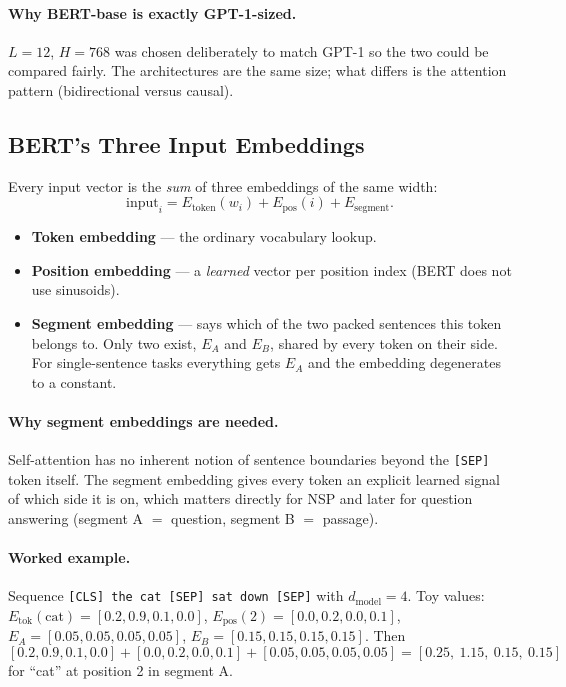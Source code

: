 \documentclass[11pt,a4paper]{article}
\begin{document}
\paragraph{Why BERT-base is exactly GPT-1-sized.} $L = 12$, $H = 768$ was chosen deliberately
to match GPT-1 so the two could be compared fairly. The architectures are the same size; what
differs is the attention pattern (bidirectional versus causal).

\subsection{BERT's Three Input Embeddings}

Every input vector is the \emph{sum} of three embeddings of the same width:
\[
\text{input}_i = E_{\text{token}}(w_i) + E_{\text{pos}}(i) + E_{\text{segment}}.
\]
\begin{itemize}
\item \textbf{Token embedding} --- the ordinary vocabulary lookup.
\item \textbf{Position embedding} --- a \emph{learned} vector per position index (BERT does
  not use sinusoids).
\item \textbf{Segment embedding} --- says which of the two packed sentences this token belongs
  to. Only two exist, $E_A$ and $E_B$, shared by every token on their side. For
  single-sentence tasks everything gets $E_A$ and the embedding degenerates to a constant.
\end{itemize}

\paragraph{Why segment embeddings are needed.} Self-attention has no inherent notion of
sentence boundaries beyond the \texttt{[SEP]} token itself. The segment embedding gives every
token an explicit learned signal of which side it is on, which matters directly for NSP and
later for question answering (segment A $=$ question, segment B $=$ passage).

\paragraph{Worked example.} Sequence \texttt{[CLS] the cat [SEP] sat down [SEP]} with
$d_{\text{model}} = 4$. Toy values:
$E_{\text{tok}}(\text{cat}) = [0.2, 0.9, 0.1, 0.0]$,
$E_{\text{pos}}(2) = [0.0, 0.2, 0.0, 0.1]$,
$E_A = [0.05, 0.05, 0.05, 0.05]$, $E_B = [0.15, 0.15, 0.15, 0.15]$. Then
\[
[0.2,0.9,0.1,0.0] + [0.0,0.2,0.0,0.1] + [0.05,0.05,0.05,0.05] = [0.25,\ 1.15,\ 0.15,\ 0.15]
\]
for ``cat'' at position 2 in segment A.
\end{document}
